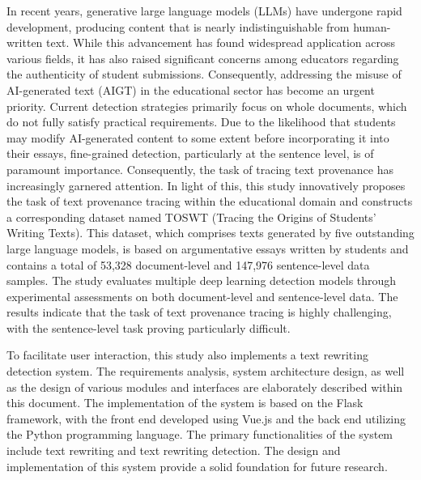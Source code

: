 \begin{abstractEn}
  In recent years, generative large language models (LLMs) have undergone rapid development, producing content that is nearly indistinguishable from human-written text. While this advancement has found widespread application across various fields, it has also raised significant concerns among educators regarding the authenticity of student submissions. Consequently, addressing the misuse of AI-generated text (AIGT) in the educational sector has become an urgent priority. Current detection strategies primarily focus on whole documents, which do not fully satisfy practical requirements. Due to the likelihood that students may modify AI-generated content to some extent before incorporating it into their essays, fine-grained detection, particularly at the sentence level, is of paramount importance. Consequently, the task of tracing text provenance has increasingly garnered attention. In light of this, this study innovatively proposes the task of text provenance tracing within the educational domain and constructs a corresponding dataset named TOSWT (Tracing the Origins of Students’ Writing Texts). This dataset, which comprises texts generated by five outstanding large language models, is based on argumentative essays written by students and contains a total of 53,328 document-level and 147,976 sentence-level data samples. The study evaluates multiple deep learning detection models through experimental assessments on both document-level and sentence-level data. The results indicate that the task of text provenance tracing is highly challenging, with the sentence-level task proving particularly difficult.

  To facilitate user interaction, this study also implements a text rewriting detection system. The requirements analysis, system architecture design, as well as the design of various modules and interfaces are elaborately described within this document. The implementation of the system is based on the Flask framework, with the front end developed using Vue.js and the back end utilizing the Python programming language. The primary functionalities of the system include text rewriting and text rewriting detection. The design and implementation of this system provide a solid foundation for future research.
\end{abstractEn}
